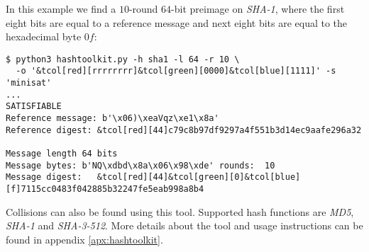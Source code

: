 In this example we find a $10$-round $64$-bit preimage on \emph{SHA-1}, where the first eight bits are equal to a reference message and next eight bits are equal to the hexadecimal byte $0f$:

\newcommand*{\tcol}[2]{\textcolor{#1}{#2}}
\begin{Verbatim}[commandchars=&\[\]]
$ python3 hashtoolkit.py -h sha1 -l 64 -r 10 \
  -o '&tcol[red][rrrrrrrr]&tcol[green][0000]&tcol[blue][1111]' -s 'minisat'
...
SATISFIABLE
Reference message: b'\x06)\xeaVqz\xe1\x8a'
Reference digest: &tcol[red][44]c79c8b97df9297a4f551b3d14ec9aafe296a32

Message length 64 bits
Message bytes: b'NQ\xdbd\x8a\x06\x98\xde' rounds:  10
Message digest:   &tcol[red][44]&tcol[green][0]&tcol[blue][f]7115cc0483f042885b32247fe5eab998a8b4
\end{Verbatim}

Collisions can also be found using this tool.
Supported hash functions are \emph{MD5}, \emph{SHA-1} and \emph{SHA-3-512}.
More details about the tool and usage instructions can be found in appendix \ref{apx:hashtoolkit}.

